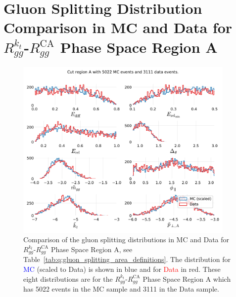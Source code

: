 \section[Gluon Splitting Distribution Comparison in MC and Data for Phase Space Region A]{Gluon Splitting Distribution Comparison in MC and Data for $R_{gg}^{k_t}$-$R_{gg}^\mathrm{CA}$ Phase Space Region A}
\begin{figure}[h!]
  \centerfloat
  \includegraphics[width=0.95\textwidth, trim=0 0 0 0, clip, page=1]{figures/quarks/gtag-R_kt_CA_histograms-down_sample=1.00-ML_vars=vertex-selection=b-ejet_min=4-n_iter_RS_lgb=99-n_iter_RS_xgb=9-cdot_cut=0.90-version=19-njet=4.pdf}
  \caption[Gluon Splitting Distribution Comparison in MC and Data for Phase Space Region A]
          {Comparison of the gluon splitting distributions in MC and Data for $R_{gg}^{k_t}$-$R_{gg}^\mathrm{CA}$ Phase Space Region A, see Table~\ref{tab:q:gluon_splitting_area_definitions}. The distribution for \textcolor{blue}{MC} (scaled to Data) is shown in blue and for \textcolor{red}{Data} in red. These eight distributions are for the $R_{gg}^{k_t}$-$R_{gg}^\mathrm{CA}$ Phase Space Region A which has \num{5022} events in the MC sample and \num{3111} in the Data sample. } 
  \label{fig:q:R_kt_CA_cut_A}
\end{figure}
\clearpage

